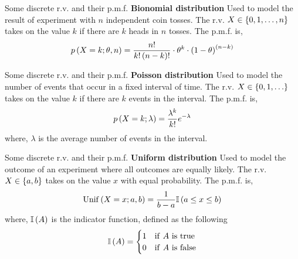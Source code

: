 \documentclass[aspectratio=169]{beamer}
\def\mb{\ensuremath\mathbb}
\def\lp{\ensuremath\left(}
\def\rp{\ensuremath\right)}
\def\lc{\ensuremath\left\{}
\def\rc{\ensuremath\right\}}
\newcommand{\ct}[1]{\lp #1\rp}
\begin{document}
\begin{frame}{Some discrete r.v. and their p.m.f.}
  \textbf{Bionomial distribution} Used to model the result of experiment with $n$ independent coin tosses. The r.v. $X \in \lc 0, 1, \ldots, n\rc$ takes on the value $k$ if there are $k$ heads in $n$ tosses. The p.m.f. is,
  \[ p\ct{X = k; \theta, n} =  \frac{n!}{k! \ct{n - k}!} \cdot \theta^k \cdot \ct{1 - \theta}^{\ct{n - k}} \]
\end{frame}


\begin{frame}{Some discrete r.v. and their p.m.f.}
  \textbf{Poisson distribution} Used to model the number of events that occur in a fixed interval of time. The r.v. $X \in \lc 0, 1, \ldots\rc$ takes on the value $k$ if there are $k$ events in the interval. The p.m.f. is,
  \[ p\ct{X = k; \lambda} =  \frac{\lambda^k}{k!} e^{-\lambda} \]
  where, $\lambda$ is the average number of events in the interval.
\end{frame}


\begin{frame}{Some discrete r.v. and their p.m.f.}
  \textbf{Uniform distribution} Used to model the outcome of an experiment where all outcomes are equally likely. The r.v. $X \in \lc a, b\rc$ takes on the value $x$ with equal probability. The p.m.f. is,
  \[ \mathrm{Unif}\ct{X = x; a, b} =  \frac{1}{b - a} \mb{I}\ct{a \leq x \leq b} \]
  where, $\mb{I}\ct{A}$ is the indicator function, defined as the following
  \[ \mb{I}\ct{A} = \begin{cases}
    1 & \mathrm{if} \,\, A \,\, \mathrm{is} \,\, \mathrm{true}\\
    0 & \mathrm{if} \,\, A \,\, \mathrm{is} \,\, \mathrm{false} 
  \end{cases} \]
\end{frame}
\end{document}
